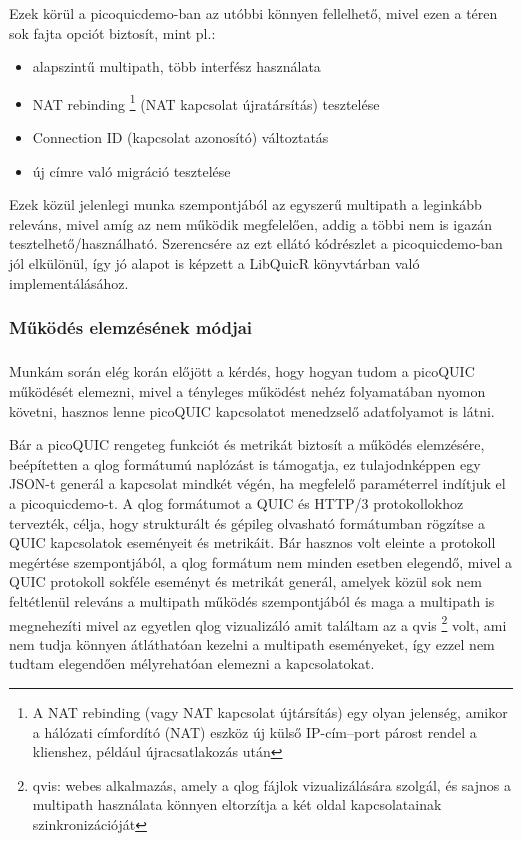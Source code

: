 \documentclass[a4paper,oneside]{article}
\begin{document}
Ezek körül a picoquicdemo-ban az utóbbi könnyen fellelhető, mivel ezen a téren sok fajta opciót biztosít, mint pl.:
\begin{itemize}
  \item alapszintű multipath, több interfész használata
  \item NAT rebinding \footnote{A NAT rebinding (vagy NAT kapcsolat újtársítás) egy olyan jelenség, 
  amikor a hálózati címfordító (NAT) eszköz új külső IP-cím–port párost rendel a klienshez, 
  például újracsatlakozás után} (NAT kapcsolat újratársítás) tesztelése
  \item Connection ID (kapcsolat azonosító) változtatás 
  \item új címre való migráció tesztelése
\end{itemize}

Ezek közül jelenlegi munka szempontjából az egyszerű multipath a leginkább releváns,
mivel amíg az nem működik megfelelően, addig a többi nem is igazán tesztelhető/használható.
Szerencsére az ezt ellátó kódrészlet a picoquicdemo-ban jól elkülönül, így jó alapot is képzett
a LibQuicR könyvtárban való implementálásához.

\subsubsection{Működés elemzésének módjai}

\subparagraph{}

Munkám során elég korán előjött a kérdés, hogy hogyan tudom a picoQUIC működését elemezni, mivel
a tényleges működést nehéz folyamatában nyomon követni, hasznos lenne picoQUIC kapcsolatot menedzselő adatfolyamot is látni.

Bár a picoQUIC rengeteg funkciót és metrikát biztosít a működés elemzésére, 
beépítetten a qlog formátumú naplózást is támogatja, ez tulajodnképpen egy JSON-t generál a kapcsolat mindkét végén, ha megfelelő paraméterrel indítjuk el a picoquicdemo-t.
A qlog formátumot a QUIC és HTTP/3 protokollokhoz tervezték, célja, hogy strukturált és gépileg olvasható formátumban rögzítse a QUIC kapcsolatok eseményeit és metrikáit.
Bár hasznos volt eleinte a protokoll megértése szempontjából, a qlog formátum nem minden esetben elegendő, mivel a QUIC protokoll
sokféle eseményt és metrikát generál, amelyek közül sok nem feltétlenül releváns a 
multipath működés szempontjából és maga a multipath is megnehezíti mivel az egyetlen 
qlog vizualizáló amit találtam az a qvis \footnote{qvis: webes alkalmazás, amely a qlog 
fájlok vizualizálására szolgál, és sajnos a multipath használata könnyen eltorzítja a két oldal 
kapcsolatainak szinkronizációját} volt, ami nem tudja könnyen átláthatóan kezelni a multipath eseményeket, 
így ezzel nem tudtam elegendően mélyrehatóan elemezni a kapcsolatokat.
\end{document}
